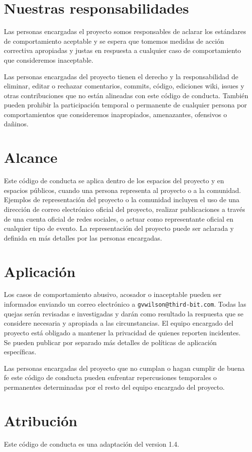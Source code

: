 \section*{Nuestras responsabilidades}

Las personas encargadas el proyecto somos responsables de aclarar los est\'andares de
comportamiento aceptable y se espera que tomemos medidas de acci\'on correctiva 
apropiadas y justas en respuesta a cualquier caso de comportamiento que 
consideremos inaceptable.

Las personas encargadas del proyecto tienen el derecho y la responsabilidad de 
eliminar, editar o rechazar comentarios, commits, c\'odigo, ediciones wiki, issues y otras
contribuciones que no est\'an alineadas con este c\'odigo de conducta. Tambi\'en pueden 
prohibir la participaci\'on temporal o permanente de cualquier persona por comportamientos 
que consideremos inapropiados, amenazantes, ofensivos o da\~ninos.

\section*{Alcance}

Este c\'odigo de conducta se aplica dentro de los espacios del proyecto 
y en espacios p\'ublicos, cuando una persona representa al proyecto o a
la comunidad. Ejemplos de representaci\'on del proyecto o la comunidad incluyen
el uso de una direcci\'on de correo electr\'onico oficial del proyecto, 
realizar publicaciones a trav\'es de una cuenta oficial de redes sociales, 
o actuar como representante oficial en cualquier tipo de evento. 
La representaci\'on del proyecto puede ser aclarada y definida en m\'as
detalles por las personas encargadas.

\section*{Aplicaci\'on}

Los casos de comportamiento abusivo, acosador o inaceptable 
pueden ser informados enviando un correo electr\'onico a \texttt{gvwilson@third-bit.com}. 
Todas las quejas ser\'an revisadas e investigadas y dar\'an como resultado 
la respuesta que se considere necesaria y apropiada a las circunstancias.
El equipo encargado del proyecto est\'a obligado a mantener la privacidad de 
quienes reporten incidentes.  Se pueden publicar por separado m\'as detalles 
de pol\'iticas de aplicaci\'on espec\'ificas.

Las personas encargadas del proyecto que no cumplan o hagan cumplir 
de buena fe este c\'odigo de conducta pueden enfrentar repercusiones 
temporales o permanentes determinadas por el resto del equipo encargado 
del proyecto.

\section*{Atribuci\'on}

Este c\'odigo de conducta es una adaptaci\'on del 
 version 1.4.
